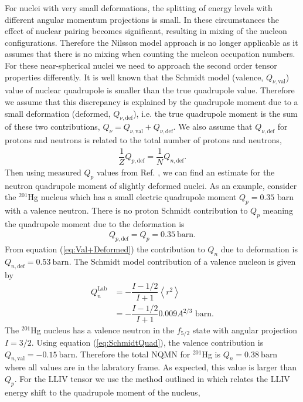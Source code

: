 \documentclass[10pt,a4paper, twoside, openright]{report}
\begin{document}
For nuclei with very small deformations, the splitting of energy levels with different angular momentum projections is small.
 In these circumstances the effect of nuclear pairing becomes significant, resulting in mixing of the nucleon configurations. Therefore the Nilsson model approach is no longer applicable as it assumes that there is no mixing when counting the nucleon occupation numbers. For these near-spherical nuclei we need to approach the second order tensor properties differently.  It is well known that the Schmidt model (valence, $Q_{\nu, \text{val}}$) value of nuclear quadrupole is smaller than the true quadrupole value. Therefore we assume that this discrepancy is explained by the quadrupole moment due to a small deformation (deformed, $Q_{\nu, \text{def}}$), i.e. the true quadrupole moment is the sum of these two contributions, $Q_{\nu} = Q_{\nu, \text{val}} + Q_{\nu, \text{def}}$. We also assume that $Q_{\nu,\text{def}}$ for protons and neutrons is related to the total number of protons and neutrons,
\begin{align} \label{eq:Val+Deformed}
\dfrac{1}{Z}Q_{p, \text{def}} = \dfrac{1}{N}Q_{n,\text{def}}.
\end{align}
Then using measured $Q_{p}$ values from Ref. \cite{Stone2005}, we can find an estimate for the neutron quadrupole moment of slightly deformed nuclei. As an example, consider the $^{201}$Hg nucleus which has a small electric quadrupole moment $Q_{p} = 0.35 $ barn with a valence neutron. There is no proton Schmidt contribution to $Q_{p}$ meaning the quadrupole moment due to the deformation is 
\begin{align*}
Q_{p,\text{def}} = Q_{p} = 0.35 \ \text{barn}.
\end{align*}
From equation (\ref{eq:Val+Deformed}) the contribution to $Q_{n}$ due to deformation is $Q_{n,\text{def}}=0.53 \ \text{barn}$. The Schmidt model contribution of a valence nucleon is given by \cite{BohrMottVol1, Flambaum2016}
\begin{align} \label{eq:SchmidtQuad}
Q_{n}^{\text{Lab}} &= -\dfrac{I - 1/2}{I + 1}\left<r^2\right> \\
&= -\dfrac{I - 1/2}{I + 1}0.009A^{2/3} \text{ barn}.
\end{align}
 The $^{201}$Hg nucleus has a valence neutron in the $f_{5/2}$ state with angular projection $I =3/2$. Using equation (\ref{eq:SchmidtQuad}), the valence contribution is $Q_{n,\text{val}} = -0.15 \ \text{barn}$. Therefore the total NQMN for $^{201}$Hg is $Q_{n} = 0.38 \ \text{barn}$ where all values are in the labratory frame. As expected, this value is larger than $Q_{p}$. For the LLIV tensor we use the method outlined in \cite{Flambaum2016} which relates the LLIV energy shift to the quadrupole moment of the nucleus,
\end{document}
